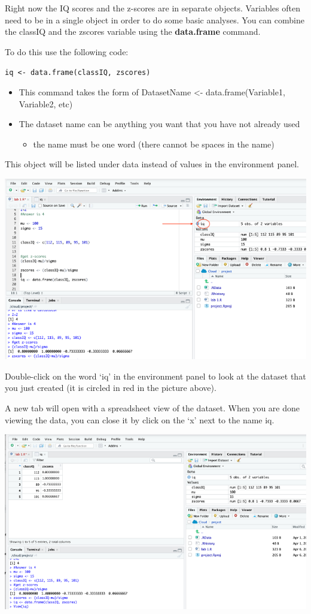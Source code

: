 \documentclass[
]{book}
\providecommand{\tightlist}{%
  \setlength{\itemsep}{0pt}\setlength{\parskip}{0pt}}
\begin{document}
Right now the IQ scores and the z-scores are in separate objects. Variables often need to be in a single object in order to do some basic analyses. You can combine the classIQ and the zscores variable using the \textbf{data.frame} command.

To do this use the following code:

\texttt{iq\ \textless{}-\ data.frame(classIQ,\ zscores)}

\begin{itemize}
\tightlist
\item
  This command takes the form of DatasetName \textless- data.frame(Variable1, Variable2, etc)\\
\item
  The dataset name can be anything you want that you have not already used

  \begin{itemize}
  \tightlist
  \item
    the name must be one word (there cannot be spaces in the name)
  \end{itemize}
\end{itemize}

This object will be listed under data instead of values in the environment panel.

\includegraphics{img/dataframe.png}

Double-click on the word `iq' in the environment panel to look at the dataset that you just created (it is circled in red in the picture above).

A new tab will open with a spreadsheet view of the dataset. When you are done viewing the data, you can close it by click on the `x' next to the name iq.

\includegraphics{img/dataframe2.png}
\end{document}
